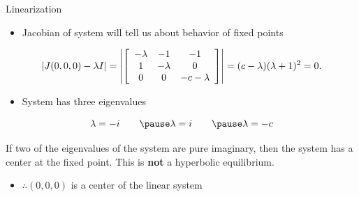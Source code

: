 \documentclass{beamer}
\begin{document}
\begin{frame}{Linearization}
    \begin{itemize}
        \item Jacobian of system will tell us about behavior of fixed points
		\pause
    \end{itemize}
	\[
		|J(0,0,0)-\lambda I| =
		\left|
		\left[
		\begin{array}{c c c}
			-\lambda & -1       & -1         \\
			1        & -\lambda & 0          \\
			0        & 0        & -c-\lambda
		\end{array}
		\right]
		\right| =
		(c-\lambda)(\lambda + 1)^{2}=0.
	\]
	\pause
	\begin{itemize}
		\item System has three eigenvalues
		\pause
	\end{itemize}
	\[
		\lambda=-i\qquad\pause \lambda=i\qquad\pause\lambda = -c
	\]
	\pause
	\begin{definition}
		If two of the eigenvalues of the system are pure imaginary, then the system has a \alert{center} at the fixed point. This is \textbf{not} a hyperbolic equilibrium.
    \end{definition}
	\pause
	\begin{itemize}
		\item $\therefore (0,0,0)$ is a center of the linear system
	\end{itemize}
\end{frame}
\end{document}
